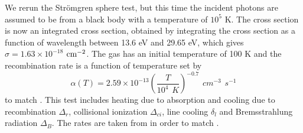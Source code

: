 \documentclass[fleq,usenatbib]{mnras}
\newcommand{\strom}{Str\"omgren}
\begin{document}
We rerun the \strom{} sphere test, but this time the incident photons are 
assumed to be from a black body with a temperature of $10^5$ K. The cross 
section is now an integrated cross section, obtained by integrating the cross 
section as a function of wavelength between 13.6 eV and 29.65 eV, which gives 
$\sigma = 1.63 \times 10^{-18}$ $\rm cm^{-2}$. The gas has an initial 
temperature of 100 K and the recombination rate is a function of temperature 
set by
\begin{equation}
\alpha(T) = 2.59 \times 10^{-13} \left( \frac{T}{10^4 \hspace{5pt} K}\right)^
{-0.7} \hspace{5pt} cm^{-3} \hspace{5pt} s^{-1}
\end{equation}
to match \cite{petkovaSpringel09}. This test includes heating due to 
absorption and cooling due to recombination $\Delta_r$, collisional 
ionization $\Delta_{ci}$, line cooling $\delta_l$ and Bremsstrahlung 
radiation $\Delta_B$. The rates are taken from \cite{cen92} in order to
match \cite{petkovaSpringel09}.
\end{document}
